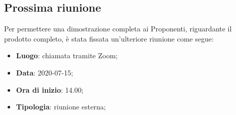 \subsection{Prossima riunione}
Per permettere una dimostrazione completa ai Proponenti, riguardante il prodotto completo, è stata fissata un'ulteriore riunione come segue: 
\begin{itemize}
	\item \textbf{Luogo}: chiamata tramite Zoom; 
	\item \textbf{Data}: 2020-07-15; 
	\item \textbf{Ora di inizio}: 14.00; 
	\item \textbf{Tipologia}: riunione esterna; 
\end{itemize}